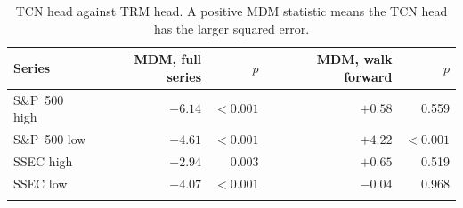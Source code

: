 \begin{table}[ht]
\caption{TCN head against TRM head. A positive MDM statistic means the TCN head has the larger squared error.}
\label{tab:heads}
\centering
\begin{tabular}{@{}lrrrr@{}}
\toprule
Series & MDM, full series & $p$ & MDM, walk forward & $p$ \\
\midrule
S\&P~500 high & ${-}6.14$ & $<0.001$ & ${+}0.58$ & 0.559 \\
S\&P~500 low & ${-}4.61$ & $<0.001$ & ${+}4.22$ & $<0.001$ \\
SSEC high & ${-}2.94$ & 0.003 & ${+}0.65$ & 0.519 \\
SSEC low & ${-}4.07$ & $<0.001$ & ${-}0.04$ & 0.968 \\
\botrule
\end{tabular}
\end{table}
